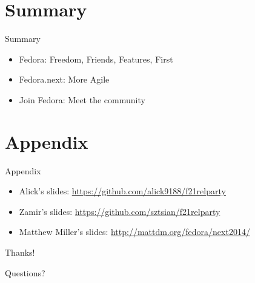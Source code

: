 \documentclass{beamer}
\begin{document}
\section*{Summary}

\begin{frame}{Summary}
  \begin{itemize}
  \item Fedora: Freedom, Friends, Features, First
  \item Fedora.next: More Agile
  \item Join Fedora: Meet the community
  \end{itemize}
\end{frame}

\section*{Appendix}

\begin{frame}{Appendix}
  \begin{itemize}
    \item Alick's slides: \url{https://github.com/alick9188/f21relparty}
    \item Zamir's slides: \url{https://github.com/sztsian/f21relparty}
    \item Matthew Miller's slides: \url{http://mattdm.org/fedora/next2014/}
  \end{itemize}
\end{frame}

\begin{frame}
  \begin{center}
    {\LARGE Thanks!
    \bigskip

    Questions?}

  \end{center}
\end{frame}
\end{document}
